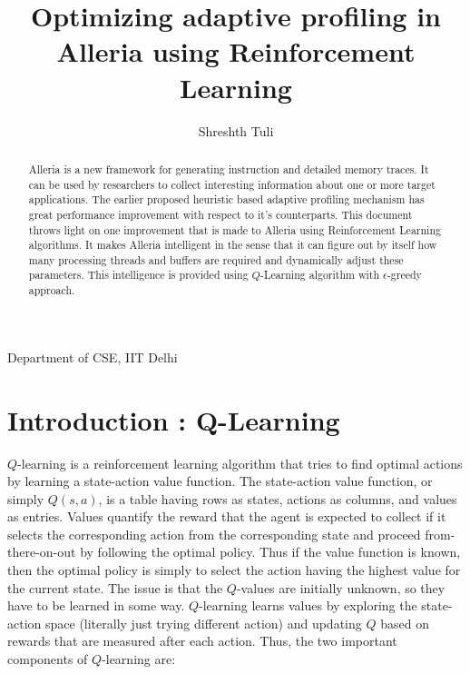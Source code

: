 \documentclass[12pt]{article}
\begin{document}
\begin{frontmatter}

\title{Optimizing adaptive profiling in Alleria using Reinforcement Learning}
\author{Shreshth Tuli}
\date{\vspace{-5ex}}
\maketitle
\begin{center}
    \footnotesize Department of CSE, IIT Delhi
\end{center}


\begin{abstract}
Alleria is a new framework for generating instruction and detailed memory traces. It can be used by researchers to collect interesting information about one or more target applications. The earlier proposed heuristic based adaptive profiling mechanism has great performance improvement with respect to it's counterparts. This document throws light on one improvement that is made to Alleria using Reinforcement Learning algorithms. It makes Alleria intelligent in the sense that it can figure out by itself how many processing threads and buffers are required and dynamically adjust these parameters. This intelligence is provided using $Q$-Learning algorithm with $\epsilon$-greedy approach.
\end{abstract}



\end{frontmatter}

\section{Introduction : Q-Learning}
\label{S:1}

$Q$-learning is a reinforcement learning algorithm that tries to find optimal actions by learning a state-action value function. The state-action value function, or simply
$Q(s,a)$, is a table having rows as states, actions as columns, and values as entries. Values quantify the reward that the agent is expected to collect if it selects the corresponding action from the corresponding state and proceed from-there-on-out by following the optimal policy. Thus if the value function is known, then the optimal policy is simply to select the action having the highest value for the current state.
The issue is that the $Q$-values are initially unknown, so they have to be learned in some way. $Q$-learning learns values by exploring the state-action space (literally just trying different action) and updating $Q$ based on rewards that are measured after each action.\newpage
Thus, the two important components of $Q$-learning are:
\end{document}

